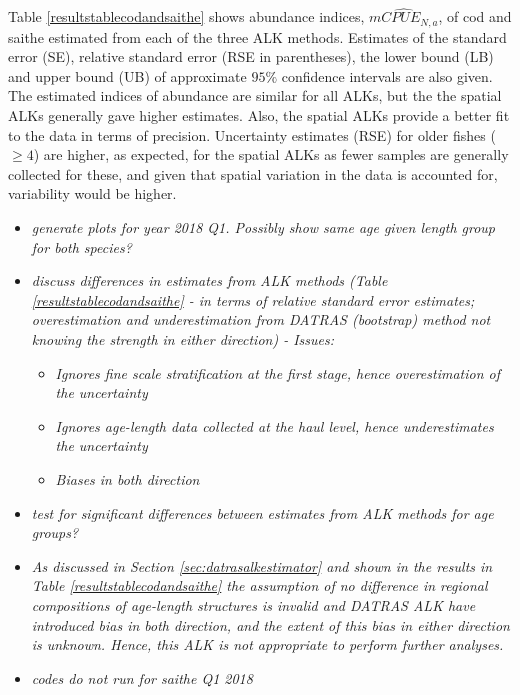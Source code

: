 \documentclass[a4paper 12pt]{article}
\numberwithin{equation}{section}
\begin{document}
Table \ref{resultstablecodandsaithe} shows abundance indices, $\widehat{mCPUE_{N,a}}$, of cod and saithe estimated from each of the three ALK methods. Estimates of the standard error (SE), relative standard error (RSE in parentheses), the lower bound (LB) and upper bound (UB) of approximate $95 \%$ confidence intervals are also given. The estimated indices of abundance are similar for all ALKs, but the the spatial ALKs generally gave higher estimates. Also, the spatial ALKs provide a better fit to the data in terms of precision. Uncertainty estimates (RSE) for older fishes ($\ge 4$) are higher, as expected, for the spatial ALKs as fewer samples are generally collected for these, and given that spatial variation in the data is accounted for, variability would be higher.


\begin{itemize}
\item \emph{generate plots for year 2018 Q1. Possibly show same age given length group for both species?}
\item \emph{discuss differences in estimates from ALK methods (Table \ref{resultstablecodandsaithe} - in terms of relative standard error estimates; overestimation and underestimation from DATRAS (bootstrap) method not knowing the strength in either direction) - Issues:}
\begin{itemize}
\item \emph{Ignores fine scale stratification at the first stage, hence overestimation of the uncertainty}
\item \emph{Ignores age-length data collected at the haul level, hence underestimates the uncertainty}
\item \emph{Biases in both direction}
\end{itemize}
\item \emph{test for significant differences between estimates from ALK methods for age groups?}
\item \emph{As discussed in Section \ref{sec:datrasalkestimator} and shown in the results in Table \ref{resultstablecodandsaithe} the assumption of no difference in regional compositions of age-length structures is invalid and DATRAS ALK have introduced bias in both direction, and the extent of this  bias in either direction is unknown. Hence, this ALK is not appropriate to perform further analyses. }
\item \emph{codes do not run for saithe Q1 2018}
\end{itemize}
\end{document}
